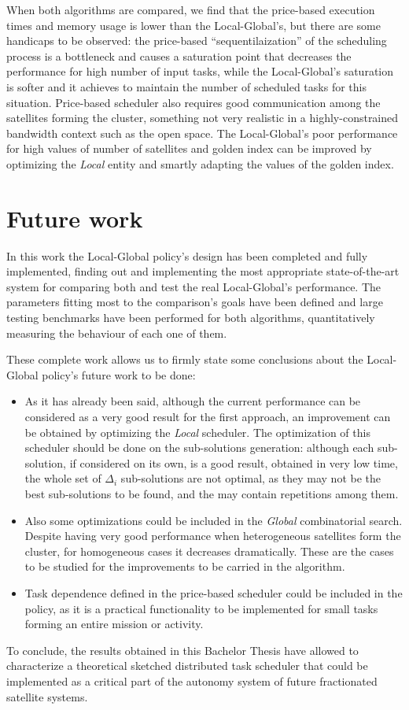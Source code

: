 When both algorithms are compared, we find that the price-based execution times and memory usage is lower than the Local-Global's, but there are some handicaps to be observed: the price-based ``sequentilaization'' of the scheduling process is a bottleneck and causes a saturation point that decreases the performance for high number of input tasks, while the Local-Global's saturation is softer and it achieves to maintain the number of scheduled tasks for this situation. Price-based scheduler also requires good communication among the satellites forming the cluster, something not very realistic in a highly-constrained bandwidth context such as the open space. The Local-Global's poor performance for high values of number of satellites and golden index can be improved by optimizing the \emph{Local} entity and smartly adapting the values of the golden index.

\section{Future work}

In this work the Local-Global policy's design has been completed and fully implemented, finding out and implementing the most appropriate state-of-the-art system for comparing both and test the real Local-Global's performance. The parameters fitting most to the comparison's goals have been defined and large testing benchmarks have been performed for both algorithms, quantitatively measuring the behaviour of each one of them.

These complete work allows us to firmly state some conclusions about the Local-Global policy's future work to be done:
\begin{itemize}
\item As it has already been said, although the current performance can be considered as a very good result for the first approach, an improvement can be obtained by optimizing the \emph{Local} scheduler. The optimization of this scheduler should be done on the sub-solutions generation: although each sub-solution, if considered on its own, is a good result, obtained in very low time, the whole set of $\Delta_i$ sub-solutions are not optimal, as they may not be the best sub-solutions to be found, and the may contain repetitions among them.
\item Also some optimizations could be included in the \emph{Global} combinatorial search. Despite having very good performance when heterogeneous satellites form the cluster, for homogeneous cases it decreases dramatically. These are the cases to be studied for the improvements to be carried in the algorithm.
\item Task dependence defined in the price-based scheduler could be included in the policy, as it is a practical functionality to be implemented for small tasks forming an entire mission or activity.
\end{itemize}

To conclude, the results obtained in this Bachelor Thesis have allowed to characterize a theoretical sketched distributed task scheduler that could be implemented as a critical part of the autonomy system of future fractionated satellite systems.